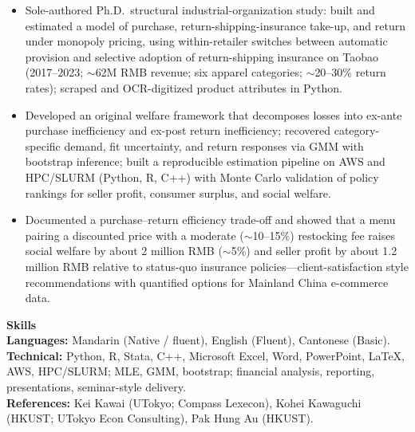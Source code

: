 \documentclass[11pt,letterpaper]{article}
\begin{document}
\begin{itemize}
  \item Sole-authored Ph.D.\ structural industrial-organization study: built and estimated a model of purchase, return-shipping-insurance take-up, and return under monopoly pricing, using within-retailer switches between automatic provision and selective adoption of return-shipping insurance on Taobao (2017--2023; \(\sim\)62M RMB revenue; six apparel categories; \(\sim\)20--30\% return rates); scraped and OCR-digitized product attributes in Python.
  \item Developed an original welfare framework that decomposes losses into ex-ante purchase inefficiency and ex-post return inefficiency; recovered category-specific demand, fit uncertainty, and return responses via GMM with bootstrap inference; built a reproducible estimation pipeline on AWS and HPC/SLURM (Python, R, C++) with Monte Carlo validation of policy rankings for seller profit, consumer surplus, and social welfare.
  \item Documented a purchase--return efficiency trade-off and showed that a menu pairing a discounted price with a moderate (\(\sim\)10--15\%) restocking fee raises social welfare by about 2 million RMB (\(\sim\)5\%) and seller profit by about 1.2 million RMB relative to status-quo insurance policies---client-satisfaction style recommendations with quantified options for Mainland China e-commerce data.
\end{itemize}

\vspace{0.15pt}

{\large \textbf{Skills}}\\[-0.5pt]
\textbf{Languages:} Mandarin (Native / fluent), English (Fluent), Cantonese (Basic).\\
\textbf{Technical:} Python, R, Stata, C++, Microsoft Excel, Word, PowerPoint, \LaTeX, AWS, HPC/SLURM; MLE, GMM, bootstrap; financial analysis, reporting, presentations, seminar-style delivery.\\
\textbf{References:} Kei Kawai (UTokyo; Compass Lexecon), Kohei Kawaguchi (HKUST; UTokyo Econ Consulting), Pak Hung Au (HKUST).
\end{document}
